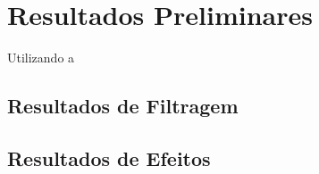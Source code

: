 \chapter[Resultados Preliminares]{Resultados Preliminares}

Utilizando a 
\section{Resultados de Filtragem}

\section{Resultados de Efeitos}